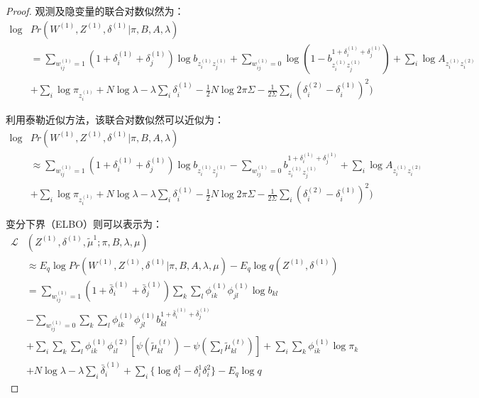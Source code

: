 \begin{proof}
	
	观测及隐变量的联合对数似然为：
	\begin{equation}
		\begin{split}
			\log &Pr(W^{(1)},Z^{(1)},\delta^{(1)}|\pi,B,A,\lambda)  \\
			&  =\sum_{w_{ij}^{(1)}=1} (1+\delta_i^{(1)}+\delta_j^{(1)}) \log b_{z_i^{(1)} z_j^{(1)}} +\sum_{w_{ij}^{(1)}=0} \log (1-b_{z_i^{(1)} z_j^{(1)}}^{1+\delta_i^{(1)}+\delta_j^{(1)}})+\sum_{i} \log A_{z_i^{(1)} z_i^{(2)}}   \\
			&  +\sum_{i} \log \pi_{z_i^{(1)}} +N\log \lambda -\lambda \sum_{i} \delta_i^{(1)} -\frac{1}{2} N \log 2 \pi \Sigma -\frac{1}{2\Sigma} \sum_{i} (\delta_i^{(2)}-\delta_i^{(1)})^2)
		\end{split}
	\end{equation}
	
	
	
	利用泰勒近似方法，该联合对数似然可以近似为：
	\begin{equation}
		\begin{split}
			\log &Pr(W^{(1)},Z^{(1)},\delta^{(1)}|\pi,B,A,\lambda)  \\
			&  \approx \sum_{w_{ij}^{(1)}=1} (1+\delta_i^{(1)}+\delta_j^{(1)}) \log b_{z_i^{(1)} z_j^{(1)}} -\sum_{w_{ij}^{(1)}=0} b_{z_i^{(1)} z_j^{(1)}}^{1+\delta_i^{(1)}+\delta_j^{(1)}}+\sum_{i} \log A_{z_i^{(1)} z_i^{(2)}}   \\
			&  +\sum_{i} \log \pi_{z_i^{(1)}} +N\log \lambda -\lambda \sum_{i} \delta_i^{(1)} -\frac{1}{2} N \log 2 \pi \Sigma -\frac{1}{2\Sigma} \sum_{i} (\delta_i^{(2)}-\delta_i^{(1)})^2)
		\end{split}
	\end{equation}
	
	变分下界（ELBO）则可以表示为：
	\begin{equation}
		\begin{split}
			\mathscr{L}&(Z^{(1)},\delta^{(1)},\tilde{\mu}^1;\pi,B,\lambda,\mu)  \\
			& \approx E_q \log Pr(W^{(1)},Z^{(1)},\delta^{(1)}|\pi,B,A,\lambda,\mu) - E_q \log q(Z^{(1)},\delta^{(1)})   \\
			& =\sum_{w_{ij}^{(1)}=1} (1+\bar{\delta}_i^{(1)}+\bar{\delta}_j^{(1)}) \sum_k \sum_l \phi_{ik}^{(1)}\phi_{jl}^{(1)} \log b_{kl} \\
			& -\sum_{w_{ij}^{(1)}=0} \sum_k \sum_l \phi_{ik}^{(1)}\phi_{jl}^{(1)}  b_{kl}^{1+\bar{\delta}_i^{(1)}+\bar{\delta}_j^{(1)}} \\
			& +\sum_i \sum_k \sum_l \phi_{ik}^{(1)}\phi_{il}^{(2)} [\psi(\tilde{\mu}_{kl}^{(t)}) - \psi(\sum_l \tilde{\mu}_{kl}^{(t)})] +\sum_i \sum_k \phi_{ik}^{(1)} \log \pi_k \\
			& +  N\log \lambda -\lambda \sum_i \bar{\delta}_i^{(1)} +\sum_i\{ \log \delta_i^{1} - \delta_i^1 \delta_i^2\} -E_q \log q
		\end{split}
	\end{equation}
	

\end{proof}
